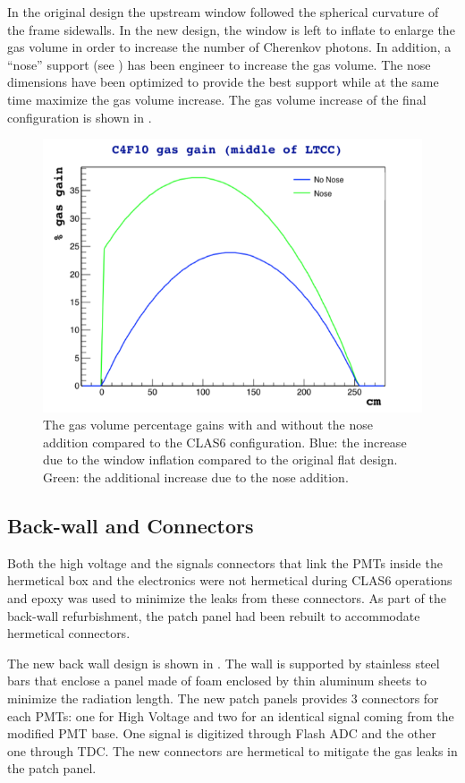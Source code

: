 In the original design the upstream window followed the spherical curvature of the frame sidewalls. In the new design, the window is left to inflate
to enlarge the gas volume in order to increase the number of Cherenkov photons. In addition, a ``nose'' support (see )
has been engineer to increase the gas volume.
The nose dimensions have been optimized to provide the best support while at the same time maximize the gas volume increase. The gas volume increase
of the final configuration is shown in .

\begin{figure}
	\centering
	\includegraphics[width=0.95\columnwidth,keepaspectratio]{img/noseVolume.png}
	\caption{The gas volume percentage gains with and without the nose addition compared to the CLAS6 configuration. Blue: the increase due
	          to the window inflation compared to the original flat design. Green: the additional increase due to the nose addition. }
	\label{fig:noseVolume}
\end{figure}


\subsection{Back-wall and Connectors}

Both the high voltage and the signals connectors that link the PMTs inside the hermetical box and the electronics were not
hermetical during CLAS6 operations and epoxy was used to minimize the leaks from these connectors.
As part of the back-wall refurbishment, the patch panel had been rebuilt to accommodate hermetical connectors.

The new back wall design is shown in . The wall is supported by stainless steel bars that enclose a panel made of foam enclosed by
thin aluminum sheets to minimize the radiation length.
The new patch panels provides 3 connectors for each PMTs: one for High Voltage and two for an identical signal coming from the modified PMT base.
One signal is digitized through Flash ADC and the other one through TDC. The new connectors are hermetical to mitigate the gas leaks in the patch panel.

